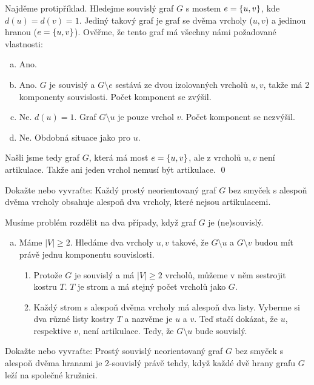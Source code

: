 \documentclass[11pt,a4paper]{article}
\begin{document}
\begin{solution}
Najděme protipříklad. Hledejme souvislý graf $G$ s mostem $e = \left\lbrace u,v \right\rbrace$, kde $d(u)=d(v)=1$. 
Jediný takový graf je graf se dvěma vrcholy ($u,v$) a jedinou hranou ($e=\left\lbrace u,v \right\rbrace$).
Ověřme, že tento graf má všechny námi požadované vlastnosti:
\begin{enumerate}[(a), noitemsep]
    \item {} Ano.
    \item {} Ano. $G$ je souvislý a $G \setminus e$ sestává ze dvou izolovaných vrcholů $u,v$, 
    takže má 2 komponenty souvislosti. Počet komponent se zvýšil.
    \item {} Ne. $d(u)=1$. Graf $G \setminus u$ je pouze vrchol $v$. Počet komponent se nezvýšil.
    \item {} Ne. Obdobná situace jako pro $u$.
\end{enumerate}
Našli jsme tedy graf $G$, která má most $e = \left\lbrace u,v \right\rbrace$, ale  z vrcholů $u,v$ není artikulace. Takže ani 
jeden vrchol nemusí být artikulace.
\hspace{\fill}\qed
\end{solution}

\begin{exercise}
Dokažte nebo vyvraťte: Každý prostý neorientovaný graf $G$ bez smyček s alespoň dvěma vrcholy obsahuje alespoň dva 
vrcholy, které nejsou artikulacemi.
\end{exercise}
\begin{solution}
Musíme problém rozdělit na dva případy, když graf $G$ je (ne)souvislý.
\begin{enumerate}[(a)]
    \item {} Máme $|V| \geq 2$. Hledáme dva vrcholy $u,v$ takové, že $G \setminus u$ a 
    $G \setminus v$ budou mít právě jednu komponentu souvislosti.
    \begin{enumerate}
        \item Protože $G$ je souvislý a má $|V| \geq 2$ vrcholů, můžeme v něm sestrojit kostru $T$. $T$ je strom a má 
        stejný počet vrcholů jako $G$.
        \item Každý strom s alespoň dvěma vrcholy má alespoň dva listy. Vyberme si dva různé listy kostry $T$ a nazvěme 
        je $u$ a $v$. Teď stačí dokázat, že $u$, respektive $v$, není artikulace. Tedy, že $G \setminus u$ bude 
        souvislý.
    \end{enumerate}
\end{enumerate}
\end{solution}

\begin{exercise}
Dokažte nebo vyvraťte: Prostý souvislý neorientovaný graf $G$ bez smyček s alespoň dvěma hranami je 2-souvislý právě 
tehdy, když každé dvě hrany grafu $G$ leží na společné kružnici.
\end{exercise}
\begin{solution}

\end{solution}
\end{document}
